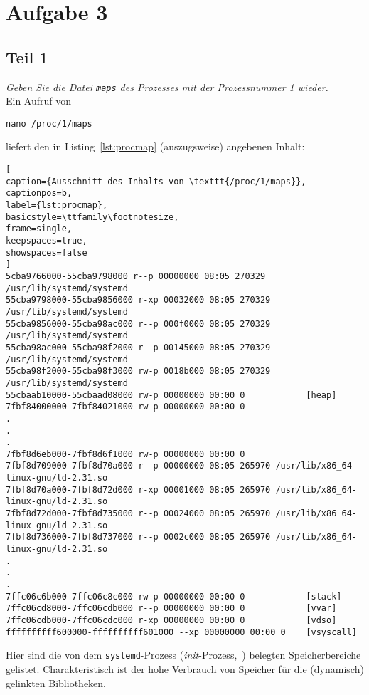 \chapter{Aufgabe 3}

\section{Teil 1}

\textit{Geben Sie die Datei \texttt{maps} des Prozesses mit der Prozessnummer 1 wieder.}\\

\noindent
Ein Aufruf von

\begin{center}
    \texttt{nano /proc/1/maps}
\end{center}

\noindent
liefert den in Listing~\ref{lst:procmap} (auszugsweise) angebenen Inhalt:

\begin{lstlisting}[
caption={Ausschnitt des Inhalts von \texttt{/proc/1/maps}},
captionpos=b,
label={lst:procmap},
basicstyle=\ttfamily\footnotesize,
frame=single,
keepspaces=true,
showspaces=false
]
5cba9766000-55cba9798000 r--p 00000000 08:05 270329        /usr/lib/systemd/systemd
55cba9798000-55cba9856000 r-xp 00032000 08:05 270329       /usr/lib/systemd/systemd
55cba9856000-55cba98ac000 r--p 000f0000 08:05 270329       /usr/lib/systemd/systemd
55cba98ac000-55cba98f2000 r--p 00145000 08:05 270329       /usr/lib/systemd/systemd
55cba98f2000-55cba98f3000 rw-p 0018b000 08:05 270329       /usr/lib/systemd/systemd
55cbaab10000-55cbaad08000 rw-p 00000000 00:00 0            [heap]
7fbf84000000-7fbf84021000 rw-p 00000000 00:00 0
.
.
.
7fbf8d6eb000-7fbf8d6f1000 rw-p 00000000 00:00 0
7fbf8d709000-7fbf8d70a000 r--p 00000000 08:05 265970 /usr/lib/x86_64-linux-gnu/ld-2.31.so
7fbf8d70a000-7fbf8d72d000 r-xp 00001000 08:05 265970 /usr/lib/x86_64-linux-gnu/ld-2.31.so
7fbf8d72d000-7fbf8d735000 r--p 00024000 08:05 265970 /usr/lib/x86_64-linux-gnu/ld-2.31.so
7fbf8d736000-7fbf8d737000 r--p 0002c000 08:05 265970 /usr/lib/x86_64-linux-gnu/ld-2.31.so
.
.
.
7ffc06c6b000-7ffc06c8c000 rw-p 00000000 00:00 0            [stack]
7ffc06cd8000-7ffc06cdb000 r--p 00000000 00:00 0            [vvar]
7ffc06cdb000-7ffc06cdc000 r-xp 00000000 00:00 0            [vdso]
ffffffffff600000-ffffffffff601000 --xp 00000000 00:00 0    [vsyscall]
\end{lstlisting}

\noindent
Hier sind die von dem \texttt{systemd}-Prozess (\textit{init}-Prozess,~\cite[92]{Man20e}) belegten Speicherbereiche gelistet.
Charakteristisch ist der hohe Verbrauch von Speicher für die (dynamisch) gelinkten Bibliotheken.

